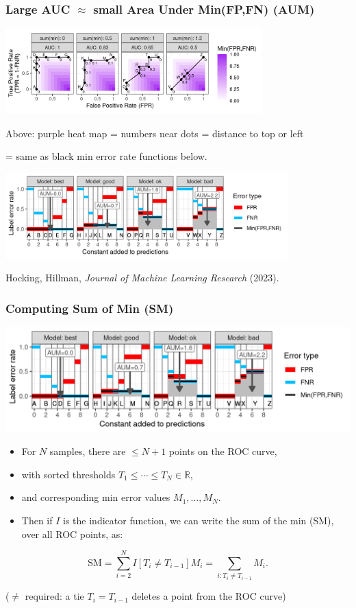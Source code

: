 \documentclass[t]{beamer}
\begin{document}
\begin{frame}
  \frametitle{Large AUC $\approx$ small Area Under Min(FP,FN) (AUM)}
  \small
  
  \includegraphics[height=1.3in]{figure-more-than-one-new-binary-heat}

  Above: purple heat map = numbers near dots = distance to top or left

  = same as black min error rate functions below.

  \includegraphics[height=1.3in]{figure-more-than-one-new-binary-aum-rate}

  Hocking, Hillman, \emph{Journal of Machine Learning Research} (2023).

  
\end{frame}

\begin{frame}
  \frametitle{Computing Sum of Min (SM)}
  \includegraphics[width=\textwidth]{figure-more-than-one-new-binary-aum-rate}
  \vskip -0.2cm
  \begin{itemize}
  \item For $N$ samples, there are $\leq N+1$ points on the ROC curve,
  \item with sorted thresholds $T_1\leq\cdots\leq T_N\in\mathbb R$,
  \item and corresponding min error values $M_1,\dots,M_N$.
  \item Then if $I$ is the indicator function, we can write the sum of
    the min (SM), over all ROC points, as:
  \end{itemize}
\begin{equation*}
  \label{eq:SM-computation}
    \text{SM} =
    \sum_{i=2}^{N}
    I[ T_{i} \neq T_{i-1} ]
    M_i =
    \sum_{i:T_{i} \neq T_{i-1} }
    M_i.
\end{equation*}

($\neq$ required: a tie $T_i=T_{i-1}$ deletes a point from the ROC curve)

\end{frame}
\end{document}
